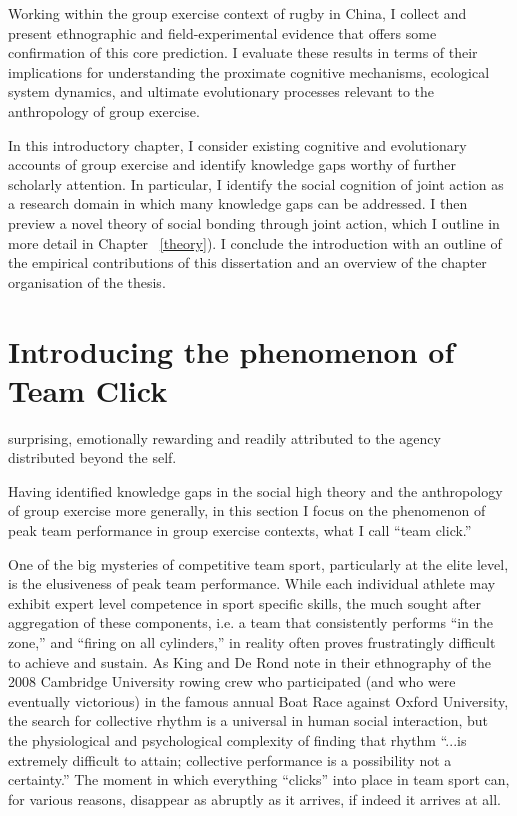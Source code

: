 \begin{CJK}{UTF8}{gbsn}
  Working within the group exercise context of rugby in China, I collect and present ethnographic and field-experimental evidence that offers some confirmation of this core prediction.  I evaluate these results in terms of their implications for understanding the proximate cognitive mechanisms, ecological system dynamics, and ultimate evolutionary processes relevant to the anthropology of group exercise.

In this introductory chapter, I consider existing cognitive and evolutionary accounts of group exercise and identify knowledge gaps worthy of further scholarly attention.  In particular, I identify the  social cognition of joint action as a research domain in which many knowledge gaps can be addressed.  I then preview a novel theory of social bonding through joint action, which I outline in more detail in Chapter ~\ref{theory}).  I conclude the introduction with an outline of the empirical contributions of this dissertation and an overview of the chapter organisation of the thesis.










\section{Introducing the phenomenon of Team Click\label{sect:teamClickIntro}}


surprising, emotionally rewarding and readily attributed to the agency distributed beyond the self.

Having identified knowledge gaps in the social high theory and the anthropology of group exercise more generally, in this section I focus on the phenomenon of peak team performance in group exercise contexts, what I call ``team click.''

One of the big mysteries of competitive team sport, particularly at the elite level, is the elusiveness of peak team performance.  While each individual athlete may exhibit expert level competence in sport specific skills, the much sought after aggregation of these components, i.e. a team that consistently performs ``in the zone,'' and ``firing on all cylinders,'' in reality often proves frustratingly difficult to achieve and sustain.  As King and De Rond \textcite[568]{King2011} note in their ethnography of the 2008 Cambridge University rowing crew who participated (and who were eventually victorious) in the famous annual Boat Race against Oxford University, the search for collective rhythm is a universal in human social interaction, but  the physiological and psychological complexity of finding that rhythm ``...is extremely difficult to attain; collective performance is a possibility not a certainty.''   The moment in which everything ``clicks'' into place in team sport can, for various reasons, disappear as abruptly as it arrives, if indeed it arrives at all.


\end{CJK}
